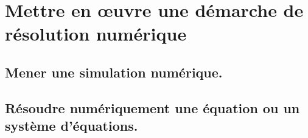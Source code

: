 \documentclass[10pt,fleqn]{article}
\newcommand{\repRel}{../..}
\newcommand{\repStyle}{\repRel/Style}
\newcommand{\td}{fichier_td}
\newcommand{\repExos}{\repRel/ExercicesCompetences}
\newcommand{\repExo}{dossier}
\begin{document}
\begin{multicols}{2}
\renewcommand{\repExo}{\repExos/C2_MettreEnOeuvreDemarche/C2_09_DeterminerLoiMouvement_TEC/19_Graham}
\renewcommand{\td}{19_Graham}
\graphicspath{{\repStyle/png/}{\repExo/images/}}


\renewcommand{\repExo}{\repExos/C2_MettreEnOeuvreDemarche/C2_09_DeterminerLoiMouvement_TEC/20_VariateurBilles}
\renewcommand{\td}{20_VariateurBilles}
\graphicspath{{\repStyle/png/}{\repExo/images/}}


\renewcommand{\repExo}{\repExos/C2_MettreEnOeuvreDemarche/C2_09_DeterminerLoiMouvement_TEC/49_ElevateurBateaux}
\renewcommand{\td}{49_ElevateurBateaux}
\graphicspath{{\repStyle/png/}{\repExo/images/}}


\renewcommand{\repExo}{\repExos/C2_MettreEnOeuvreDemarche/C2_09_DeterminerLoiMouvement_TEC/50_BancBalafre}
\renewcommand{\td}{50_BancBalafre}
\graphicspath{{\repStyle/png/}{\repExo/images/}}


\renewcommand{\repExo}{\repExos/C2_MettreEnOeuvreDemarche/C2_09_DeterminerLoiMouvement_TEC/64_EPAS}
\renewcommand{\td}{64_EPAS}
\graphicspath{{\repStyle/png/}{\repExo/images/}}


\end{multicols}

\section{Mettre en œuvre une démarche de résolution numérique} 

\subsection{Mener une simulation numérique. } 

\begin{multicols}{2} 

\end{multicols}

\subsection{Résoudre numériquement une équation ou un système d'équations. } 

\begin{multicols}{2} 

\renewcommand{\repExo}{\repExos/C3_ResolutionNumerique/C3_02_Euler/1021_Euler}
\renewcommand{\td}{1021_Euler}
\graphicspath{{\repStyle/png/}{\repExo/images/}}


\renewcommand{\repExo}{\repExos/C3_ResolutionNumerique/C3_02_Euler/1022_Euler}
\renewcommand{\td}{1022_Euler}
\graphicspath{{\repStyle/png/}{\repExo/images/}}


\renewcommand{\repExo}{\repExos/C3_ResolutionNumerique/C3_02_Euler/1023_Euler}
\renewcommand{\td}{1023_Euler}
\graphicspath{{\repStyle/png/}{\repExo/images/}}


\end{multicols}
\end{document}
